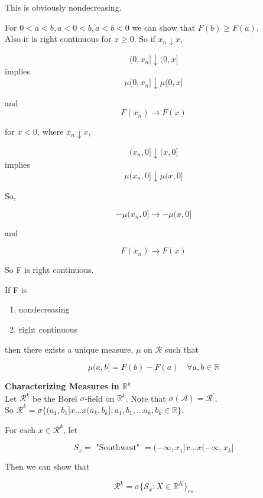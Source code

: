 \documentclass[11pt,fleqn]{book} %
\begin{document}
This is obviously nondecreasing.


For $0 < a < b, a < 0 < b, a< b< 0$ we can show that $F(b) \geq F(a)$.\\

Also it is right continuous for $x \geq 0$. So if $x_n \downarrow x$, 

		$$(0, x_n] \downarrow (0, x] $$
implies
		$$\mu(0, x_n] \downarrow \mu(0, x]  $$

and
		$$F(x_n) \rightarrow F(x) $$

for $x<0$, where $ x_n \downarrow x$, 

		$$(x_n, 0] \downarrow (x, 0] $$
implies
		$$\mu(x_n, 0] \downarrow \mu(x, 0]  $$


So, 

		$$- \mu(x_n, 0] \rightarrow -\mu(x, 0] $$

and

		$$ F(x_n) \rightarrow F(x)$$

So F is right continuous. \\


\begin{theorem}[Theorem 12.4]
		If F is 

		\begin{enumerate}
			\item nondecreasing 
			\item right continuous
		\end{enumerate}

	then there exists a unique measure, $\mu$ on $\mathcal{R}$ such that

			$$\mu(a,b] = F(b) - F(a)  \quad \forall a, b \in \mathbb{R}$$
\end{theorem}


\textbf{Characterizing Measures in $\mathbb{R}^k$}\\

Let $\mathcal{R}^k$ be the Borel $\sigma$-field on $\mathbb{R}^k$. Note that $\sigma(\mathcal{A}) = \mathcal{R}^\prime$. \\

So $\mathcal{R}^k = \sigma \{(a_1, b_1]x \dots x (a_k, b_k]: a_1, b_1, \dots a_k, b_k \in \mathbb{R} \}$. 

For each $x  \in \mathcal{R}^k$, let

		$$S_x =  \text{ "Southwest" } = (-\infty, x_1] x \dots x (-\infty, x_k]$$


Then we can show that 

		$$ \mathcal{R}^k = \sigma \{S_x: X \in \mathbb{R}^K \}_{rs}$$
\end{document}
